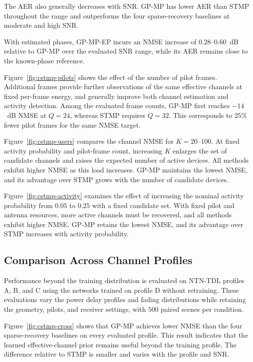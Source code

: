 The AER also generally decreases with SNR. GP-MP has lower AER than
STMP throughout the range and outperforms the four sparse-recovery
baselines at moderate and high SNR.

With estimated phases, GP-MP-EP incurs an NMSE increase of
$0.28$--$0.60$~dB relative to GP-MP over the evaluated SNR range,
while its AER remains close to the known-phase reference.

Figure~\ref{fig:cstmp-pilots} shows the effect of the number of pilot frames.
Additional frames provide further observations of the same effective
channels at fixed per-frame energy, and generally improve both channel
estimation and activity detection. Among the evaluated frame counts,
GP-MP first reaches $-14$~dB NMSE at $Q=24$, whereas STMP requires
$Q=32$. This corresponds to $25\%$ fewer pilot frames for the same
NMSE target.

Figure~\ref{fig:cstmp-users} compares the channel NMSE for $K=20$--$100$.
At fixed activity probability and pilot-frame count, increasing $K$
enlarges the set of candidate channels and raises the expected number
of active devices. All methods exhibit higher NMSE as this load increases.
GP-MP maintains the lowest NMSE, and its advantage over STMP grows
with the number of candidate devices.

Figure~\ref{fig:cstmp-activity} examines the effect of increasing the
nominal activity probability from $0.05$ to $0.25$ with a fixed candidate
set. With fixed pilot and antenna resources, more active channels must
be recovered, and all methods exhibit higher NMSE. GP-MP retains
the lowest NMSE, and its advantage over STMP increases with activity
probability.

\subsection{Comparison Across Channel Profiles}
Performance beyond the training distribution is evaluated on NTN-TDL
profiles A, B, and C using the networks trained on profile D without
retraining. These evaluations vary the power delay profiles and fading
distributions while retaining the geometry, pilots, and receiver
settings, with $500$ paired scenes per condition.

Figure~\ref{fig:cstmp-cross} shows that GP-MP achieves lower NMSE than
the four sparse-recovery baselines on every evaluated profile.
This result indicates that the learned effective-channel prior remains
useful beyond the training profile. The difference relative to STMP
is smaller and varies with the profile and SNR.
